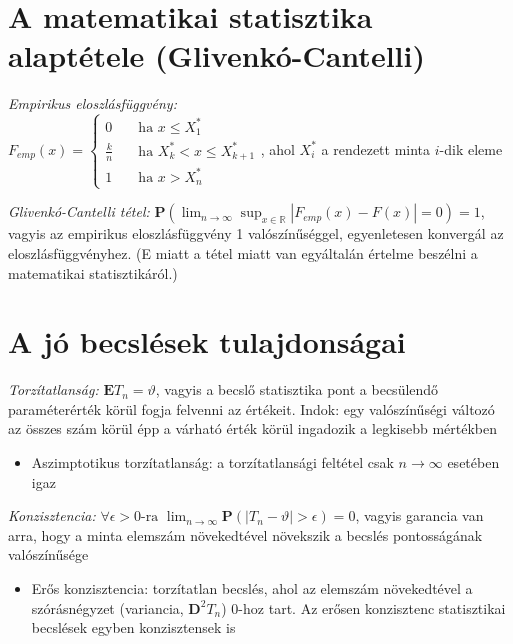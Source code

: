 \section{A matematikai statisztika alaptétele (Glivenkó-Cantelli)}

\emph{Empirikus eloszlásfüggvény:}\\
$F_{emp}(x) = 
  \begin{cases}
    0       & \quad \text{ha } x \leq X_1^* \\
    \frac{k}{n}  & \quad \text{ha } X_k^* < x \leq X_{k+1}^*\\
    1		& \quad \text{ha } x>X_n^* \end{cases}
$, ahol $X_i^*$ a rendezett minta $i$-dik eleme

\emph{Glivenkó-Cantelli tétel:} $\mathbf{P}(\lim_{n\rightarrow \infty}\sup_{x\in\mathbb{R}}|F_{emp}(x)-F(x)|=0)=1$, vagyis az empirikus eloszlásfüggvény 1 valószínűséggel, egyenletesen konvergál az eloszlásfüggvényhez. (E miatt a tétel miatt van egyáltalán értelme beszélni a matematikai statisztikáról.)

\section{A jó becslések tulajdonságai}

\emph{Torzítatlanság:} $\mathbf{E}T_n=\vartheta$, vagyis a becslő statisztika pont a becsülendő paraméterérték körül fogja felvenni az értékeit. Indok: egy valószínűségi változó az összes szám körül épp a várható érték körül ingadozik a legkisebb mértékben
	\begin{itemize}
	\item Aszimptotikus torzítatlanság: a torzítatlansági feltétel csak $n \to \infty$ esetében igaz
	\end{itemize}

\emph{Konzisztencia:} $\forall \epsilon >0 \text{-ra } \lim_{n \to \infty}\mathbf{P}(|T_n-\vartheta|>\epsilon) = 0$, vagyis garancia van arra, hogy a minta elemszám növekedtével növekszik a becslés pontosságának valószínűsége
	\begin{itemize}
	\item Erős konzisztencia: torzítatlan becslés, ahol az elemszám növekedtével a szórásnégyzet (variancia, $\mathbf{D}^2T_n$) 0-hoz tart. Az erősen konzisztenc statisztikai becslések egyben konzisztensek is
	\end{itemize}

